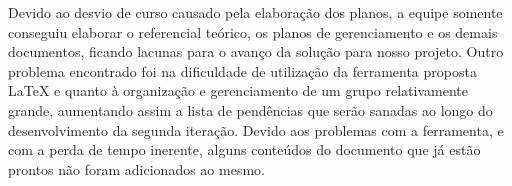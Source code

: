     Devido ao desvio de curso causado pela elaboração dos planos, a equipe somente conseguiu elaborar o referencial
    teórico, os planos de gerenciamento e os demais documentos, ficando lacunas para o avanço da solução 
    para nosso projeto. Outro problema encontrado foi na dificuldade de utilização da ferramenta proposta LaTeX e 
    quanto à organização e gerenciamento de um grupo relativamente grande, aumentando assim a lista de pendências 
    que serão sanadas ao longo do desenvolvimento da segunda iteração. Devido aos problemas com a ferramenta, e com a perda
    de tempo inerente, alguns conteúdos do documento que já estão prontos não foram adicionados ao mesmo.
